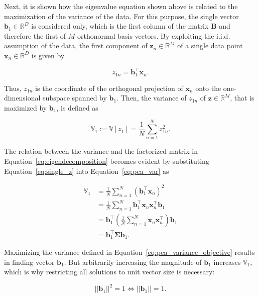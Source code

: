 \documentclass[../../../main.tex]{subfiles}
\begin{document}
Next, it is shown how the eigenvalue equation shown above is related to the maximization of the variance of the data. For this purpose, the single vector $\bm{b}_1 \in \mathbb{R}^D$ is considered only, which is the first column of the matrix $\bm{B}$ and therefore the first of $M$ orthonormal basis vectors. By exploiting the i.i.d. assumption of the data, the first component of $\bm{z}_n \in \mathbb{R}^M$ of a single data point $\bm{x}_n \in \mathbb{R}^D$ is given by

\begin{equation}\label{eq:single_z}
    z_{1n} = \bm{b}_1^\top\bm{x}_n.
\end{equation}

Thus, $z_{1n}$ is the coordinate of the orthogonal projection of $\bm{x}_n$ onto the one-dimensional subspace spanned by $\bm{b}_1$. Then, the variance of $z_{1n}$ of $\bm{z} \in \mathbb{R}^M$, that is maximized by $\bm{b}_1$, is defined as

\begin{equation}\label{eq:pca_var}
    \mathbb{V}_1:= \mathbb{V}[z_1] = \frac{1}{N}\sum_{n=1}^N z_{1n}^2.
\end{equation}

The relation between the variance and the factorized matrix in Equation~\ref{eq:eigendecomposition} becomes evident by substituting Equation~\ref{eq:single_z} into Equation~\ref{eq:pca_var} as

\begin{equation}\label{eq:pca_variance_objective}
    \begin{aligned}
        \mathbb{V}_1 &= \frac{1}{N}\sum\limits^N_{n=1}(\bm{b}_1^\top\bm{x}_n)^2 \\
        &= \frac{1}{N}\sum\limits^N_{n=1} \bm{b}_1^\top \bm{x}_n \bm{x}_n^\top \bm{b}_1 \\
        &= \bm{b}_1^\top(\frac{1}{N}\sum\limits^N_{n=1} \bm{x}_n \bm{x}_n^\top ) \bm{b}_1 \\
        &= \bm{b}_1^\top \bm{\Sigma} \bm{b}_1.
    \end{aligned}
\end{equation}

Maximizing the variance defined in Equation~\ref{eq:pca_variance_objective} results in finding vector $\bm{b}_1$. But arbitrarily increasing the magnitude of $\bm{b}_1$ increases $\mathbb{V}_1$, which is why restricting all solutions to unit vector size is necessary:

\begin{equation*}
    || \bm{b}_1 || ^2 = 1 \Leftrightarrow || \bm{b}_1 || = 1.
\end{equation*}
\end{document}
